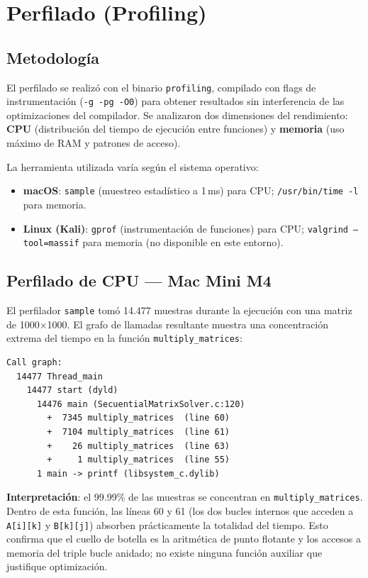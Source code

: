 \documentclass{article}
\begin{document}
\section{Perfilado (Profiling)}

\subsection{Metodología}

El perfilado se realizó con el binario \texttt{profiling}, compilado con flags de instrumentación (\texttt{-g -pg -O0}) para obtener resultados sin interferencia de las optimizaciones del compilador. Se analizaron dos dimensiones del rendimiento: \textbf{CPU} (distribución del tiempo de ejecución entre funciones) y \textbf{memoria} (uso máximo de RAM y patrones de acceso).

La herramienta utilizada varía según el sistema operativo:
\begin{itemize}
    \item \textbf{macOS}: \texttt{sample} (muestreo estadístico a 1\,ms) para CPU; \texttt{/usr/bin/time -l} para memoria.
    \item \textbf{Linux (Kali)}: \texttt{gprof} (instrumentación de funciones) para CPU; \texttt{valgrind --tool=massif} para memoria (no disponible en este entorno).
\end{itemize}

\subsection{Perfilado de CPU --- Mac Mini M4}

El perfilador \texttt{sample} tomó 14.477 muestras durante la ejecución con una matriz de 1000$\times$1000. El grafo de llamadas resultante muestra una concentración extrema del tiempo en la función \texttt{multiply\_matrices}:

\begin{lstlisting}
Call graph:
  14477 Thread_main
    14477 start (dyld)
      14476 main (SecuentialMatrixSolver.c:120)
        +  7345 multiply_matrices  (line 60)
        +  7104 multiply_matrices  (line 61)
        +    26 multiply_matrices  (line 63)
        +     1 multiply_matrices  (line 55)
      1 main -> printf (libsystem_c.dylib)
\end{lstlisting}

\textbf{Interpretación}: el 99.99\% de las muestras se concentran en \texttt{multiply\_matrices}. Dentro de esta función, las líneas 60 y 61 (los dos bucles internos que acceden a \texttt{A[i][k]} y \texttt{B[k][j]}) absorben prácticamente la totalidad del tiempo. Esto confirma que el cuello de botella es la aritmética de punto flotante y los accesos a memoria del triple bucle anidado; no existe ninguna función auxiliar que justifique optimización.
\end{document}
